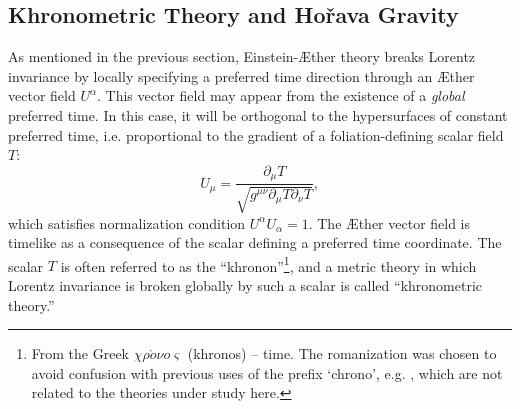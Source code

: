 \documentclass[prd,aps,twocolumn,nofootinbib,showpacs,superscriptaddress]{revtex4-1}
\begin{document}
\subsection{Khronometric Theory and Ho\v rava Gravity}
\label{Sec:KH}

As mentioned in the previous section, Einstein-\AE ther theory breaks Lorentz invariance by locally specifying a preferred time
direction through an \AE ther vector field $U^{\alpha}$. This vector field may appear from the 
existence of a  \textit{global} preferred time. In this case, it will be orthogonal to the hypersurfaces of constant preferred time, i.e. proportional to the gradient of a foliation-defining scalar field $T$:
\begin{equation}\label{U_dT}
U_\mu=\frac{\partial_\mu T}{\sqrt{g^{\mu\nu}\partial_\mu T \partial_\nu T}},
\end{equation}
which satisfies normalization condition $U^{\alpha} U_{\alpha} = 1$. The \AE ther vector field is timelike as a consequence
 of  the scalar defining a preferred time coordinate.  The scalar $T$ is often referred to as the ``khronon''\footnote{From the Greek 
$\chi\rho\acute o\nu o \varsigma$ (khronos) -- time. The romanization was chosen to avoid confusion with previous 
uses of the prefix `chrono', e.g. \cite{Levi,Segal}, which are not related to the theories under study here.}, and a metric theory in
 which Lorentz invariance is broken globally by such a scalar is called ``khronometric theory.''
\end{document}

